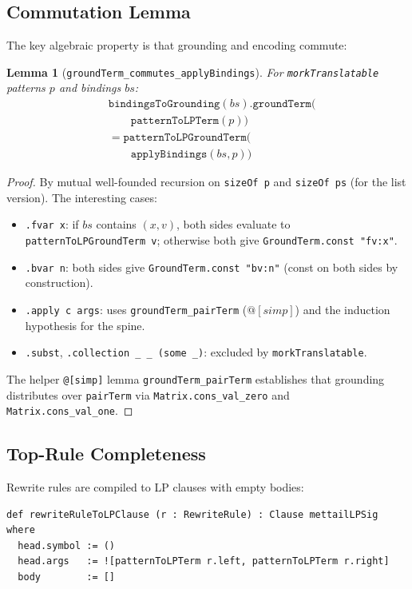 \documentclass[]{article}
\newtheorem{lemma}[theorem]{Lemma}
\newcommand{\code}[1]{\texttt{#1}}
\begin{document}
\subsection{Commutation Lemma}

The key algebraic property is that grounding and encoding commute:

\begin{lemma}[\code{groundTerm\_commutes\_applyBindings}]
\label{lem:commute}
For \code{morkTranslatable} patterns $p$ and bindings $bs$:
\[
  \begin{aligned}
  &\code{bindingsToGrounding}(bs).\code{groundTerm}( \\
  &\qquad \code{patternToLPTerm}(p)) \\
  &= \code{patternToLPGroundTerm}( \\
  &\qquad \code{applyBindings}(bs, p))
  \end{aligned}
\]
\end{lemma}

\begin{proof}
By mutual well-founded recursion on \code{sizeOf p} and \code{sizeOf ps}
(for the list version).  The interesting cases:
\begin{itemize}
\item \code{.fvar x}: if $bs$ contains $(x, v)$, both sides evaluate to
  \code{patternToLPGroundTerm v}; otherwise both give \code{GroundTerm.const "fv:x"}.
\item \code{.bvar n}: both sides give \code{GroundTerm.const "bv:n"} (const on both
  sides by construction).
\item \code{.apply c args}: uses \code{groundTerm\_pairTerm} ($@[simp]$) and the
  induction hypothesis for the spine.
\item \code{.subst}, \code{.collection \_ \_ (some \_)}: excluded by
  \code{morkTranslatable}.
\end{itemize}
The helper \code{@[simp]} lemma \code{groundTerm\_pairTerm} establishes
that grounding distributes over \code{pairTerm} via \code{Matrix.cons\_val\_zero}
and \code{Matrix.cons\_val\_one}.
\end{proof}

\subsection{Top-Rule Completeness}

Rewrite rules are compiled to LP clauses with empty bodies:

\begin{lstlisting}[language=lean]
def rewriteRuleToLPClause (r : RewriteRule) : Clause mettailLPSig where
  head.symbol := ()
  head.args   := ![patternToLPTerm r.left, patternToLPTerm r.right]
  body        := []
\end{lstlisting}
\end{document}
